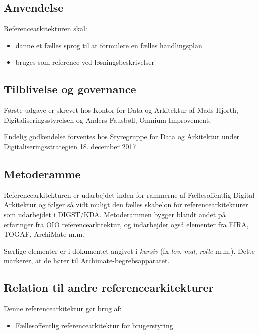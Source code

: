 \subsection{Anvendelse}\label{anvendelse}

Referencearkitekturen skal:

\begin{itemize}
\tightlist
\item
  danne et fælles sprog til at formulere en fælles handlingsplan
\item
  bruges som reference ved løsningsbeskrivelser
\end{itemize}

\subsection{Tilblivelse og governance}\label{tilblivelse-og-governance}

Første udgave er skrevet hos Kontor for Data og Arkitektur af Mads
Hjorth, Digitaliseringsstyrelsen og Anders Fausbøll, Omnium Improvement.

Endelig godkendelse forventes hos Styregruppe for Data og Arkitektur
under Digitaliseringsstrategien 18. december 2017.

\subsection{Metoderamme}\label{metoderamme}

Referencearkitekturen er udarbejdet inden for rammerne af
Fællesoffentlig Digital Arkitektur og følger så vidt muligt den fælles
skabelon for referencearkitekturer som udarbejdet i DIGST/KDA.
Metoderammen bygger blandt andet på erfaringer fra OIO
referencearkitektur, og indarbejder også elementer fra EIRA, TOGAF,
ArchiMate m.m.

Særlige elementer er i dokumentet angivet i \emph{kursiv} (fx
\emph{lov}, \emph{mål}, \emph{rolle} m.m.). Dette markerer, at de hører
til Archimate-begrebsapparatet.

\subsection{Relation til andre
referencearkitekturer}\label{relation-til-andre-referencearkitekturer}

Denne referencearkitektur gør brug af:

\begin{itemize}
\tightlist
\item
  Fællesoffentlig referencearkitektur for brugerstyring
\end{itemize}

